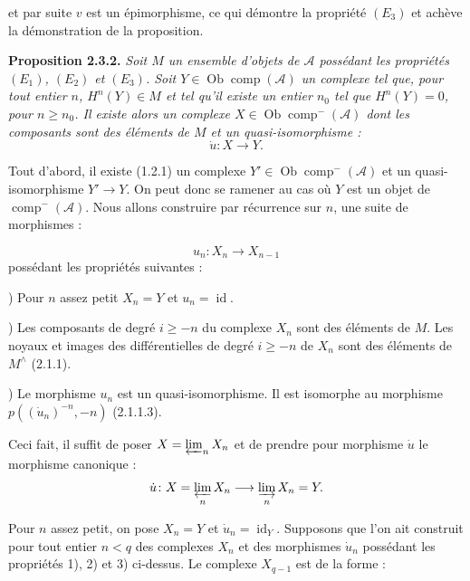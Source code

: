 \clearpage
{}%
\begingroup\small\setlength{\parskip}{0pt}\setlength{\emergencystretch}{1.5em}
\setlength{\abovedisplayskip}{4pt plus 2pt minus 2pt}%
\setlength{\belowdisplayskip}{4pt plus 2pt minus 2pt}%

et par suite $v$ est un épimorphisme, ce qui démontre la propriété $(E_3)$
et achève la démonstration de la proposition.

\medskip\noindent\textbf{Proposition 2.3.2.}
\textit{Soit $M$ un ensemble d'objets de $\mathcal A$ possédant les
propriétés $(E_1)$, $(E_2)$ et $(E_3)$. Soit
$Y\in\operatorname{Ob}\operatorname{comp}(\mathcal A)$ un complexe tel que,
pour tout entier $n$, $H^n(Y)\in M$ et tel qu'il existe un entier $n_0$ tel
que $H^n(Y)=0$, pour $n\geq n_0$. Il existe alors un complexe
$X\in\operatorname{Ob}\operatorname{comp}^{-}(\mathcal A)$ dont les
composants sont des éléments de $M$ et un quasi-isomorphisme :}
\[
\dot u\colon X\longrightarrow Y.
\]

Tout d'abord, il existe (1.2.1) un complexe
$Y'\in\operatorname{Ob}\operatorname{comp}^{-}(\mathcal A)$ et un
quasi-isomorphisme $Y'\longrightarrow Y$. On peut donc se ramener au cas où
$Y$ est un objet de $\operatorname{comp}^{-}(\mathcal A)$. Nous allons
construire par récurrence sur $n$, une suite de morphismes :

\[
u_n\colon X_n\longrightarrow X_{n-1}
\]
possédant les propriétés suivantes :

) Pour $n$ assez petit $X_n=Y$ et $u_n=\operatorname{id}$.

) Les composants de degré $i\geq -n$ du complexe $X_n$ sont des
éléments de $M$. Les noyaux et images des différentielles de degré
$i\geq -n$ de $X_n$ sont des éléments de $M^\wedge$ (2.1.1).

) Le morphisme $u_n$ est un quasi-isomorphisme. Il est isomorphe
au morphisme $p((\dot u_n)^{-n},-n)$ (2.1.1.3).

Ceci fait, il suffit de poser $X=\varprojlim_n X_n$ et de prendre pour
morphisme $\dot u$ le morphisme canonique :
\[
\dot u\colon X=\varprojlim_n X_n\longrightarrow\varinjlim_n X_n=Y.
\]

Pour $n$ assez petit, on pose $X_n=Y$ et $\dot u_n=\operatorname{id}_Y$.
Supposons que l'on ait construit pour tout entier $n<q$ des complexes $X_n$
et des morphismes $\dot u_n$ possédant les propriétés 1), 2) et 3) ci-dessus. Le
complexe $X_{q-1}$ est de la forme :

